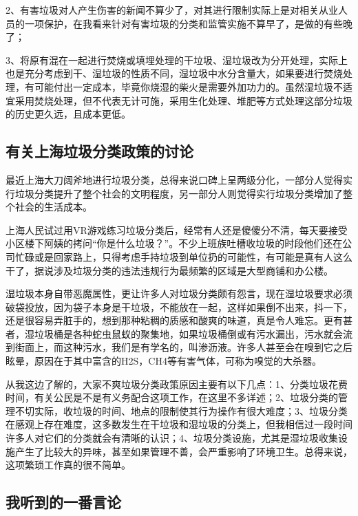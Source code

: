 \documentclass[
]{book}
\begin{document}
2、有害垃圾对人产生伤害的新闻不算少了，对其进行限制实际上是对相关从业人员的一项保护，在我看来针对有害垃圾的分类和监管实施不算早了，是做的有些晚了；

3、将原有混在一起进行焚烧或填埋处理的干垃圾、湿垃圾改为分开处理，实际上也是充分考虑到干、湿垃圾的性质不同，湿垃圾中水分含量大，如果要进行焚烧处理，有可能付出一定成本，毕竟你烧湿的柴火是需要外加功力的。虽然湿垃圾不适宜采用焚烧处理，但不代表无计可施，采用生化处理、堆肥等方式处理这部分垃圾的历史更久远，且成本更低。

\hypertarget{ux6709ux5173ux4e0aux6d77ux5783ux573eux5206ux7c7bux653fux7b56ux7684ux8ba8ux8bba}{%
\subsection{有关上海垃圾分类政策的讨论}\label{ux6709ux5173ux4e0aux6d77ux5783ux573eux5206ux7c7bux653fux7b56ux7684ux8ba8ux8bba}}

最近上海大刀阔斧地进行垃圾分类，总得来说口碑上呈两级分化，一部分人觉得实行垃圾分类提升了整个社会的文明程度，另一部分人则觉得实行垃圾分类增加了整个社会的生活成本。

上海人民试过用VR游戏练习垃圾分类后，经常有人还是傻傻分不清，每天要接受小区楼下阿姨的拷问``你是什么垃圾？''。不少上班族吐槽收垃圾的时段他们还在公司忙碌或是回家路上，只得考虑手持垃圾到单位扔的可能性，有可能是真有人这么干了，据说涉及垃圾分类的违法违规行为最频繁的区域是大型商铺和办公楼。

湿垃圾本身自带恶魔属性，更让许多人对垃圾分类颇有怨言，现在湿垃圾要求必须破袋投放，因为袋子本身是干垃圾，不能放在一起，这样如果倒不出来，抖一下，还是很容易弄脏手的，想到那种粘稠的质感和酸爽的味道，真是令人难忘。更有甚者，湿垃圾桶是各种蛇虫鼠蚁的聚集地，如果垃圾桶倒或有污水漏出，污水就会流到街面上，而这种污水，我们是有学名的，叫渗沥液。许多人甚至会在嗅到它之后眩晕，原因在于其中富含的H2S，CH4等有害气体，可称为嗅觉的大杀器。

从我这边了解的，大家不爽垃圾分类政策原因主要有以下几点：1、分类垃圾花费时间，有关公民是不是有义务配合这项工作，在这里不多详述；2、垃圾分类的管理不切实际，收垃圾的时间、地点的限制使其行为操作有很大难度；3、垃圾分类在感观上存在难度，这多数发生在干垃圾和湿垃圾的分类上，但我相信过一段时间许多人对它们的分类就会有清晰的认识；4、垃圾分类设施，尤其是湿垃圾收集设施产生了比较大的异味，甚至如果管理不善，会严重影响了环境卫生。总得来说，这项繁琐工作真的很不简单。

\hypertarget{ux6211ux542cux5230ux7684ux4e00ux756aux8a00ux8bba}{%
\subsection{我听到的一番言论}\label{ux6211ux542cux5230ux7684ux4e00ux756aux8a00ux8bba}}
\end{document}
